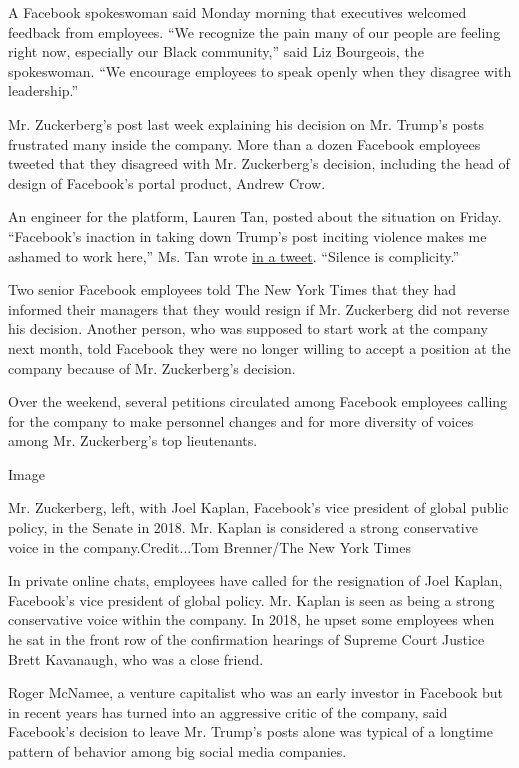A Facebook spokeswoman said Monday morning that executives welcomed
feedback from employees. ``We recognize the pain many of our people are
feeling right now, especially our Black community,'' said Liz Bourgeois,
the spokeswoman. ``We encourage employees to speak openly when they
disagree with leadership.''

Mr. Zuckerberg's post last week explaining his decision on Mr. Trump's
posts frustrated many inside the company. More than a dozen Facebook
employees tweeted that they disagreed with Mr. Zuckerberg's decision,
including the head of design of Facebook's portal product, Andrew Crow.

An engineer for the platform, Lauren Tan, posted about the situation on
Friday. ``Facebook's inaction in taking down Trump's post inciting
violence makes me ashamed to work here,'' Ms. Tan wrote
\href{https://twitter.com/sugarpirate_/status/1266470996162146304}{in a
tweet}. ``Silence is complicity.''

Two senior Facebook employees told The New York Times that they had
informed their managers that they would resign if Mr. Zuckerberg did not
reverse his decision. Another person, who was supposed to start work at
the company next month, told Facebook they were no longer willing to
accept a position at the company because of Mr. Zuckerberg's decision.

Over the weekend, several petitions circulated among Facebook employees
calling for the company to make personnel changes and for more diversity
of voices among Mr. Zuckerberg's top lieutenants.

Image

Mr. Zuckerberg, left, with Joel Kaplan, Facebook's vice president of
global public policy, in the Senate in 2018. Mr. Kaplan is considered a
strong conservative voice in the company.Credit...Tom Brenner/The New
York Times

In private online chats, employees have called for the resignation of
Joel Kaplan, Facebook's vice president of global policy. Mr. Kaplan is
seen as being a strong conservative voice within the company. In 2018,
he upset some employees when he sat in the front row of the confirmation
hearings of Supreme Court Justice Brett Kavanaugh, who was a close
friend.

Roger McNamee, a venture capitalist who was an early investor in
Facebook but in recent years has turned into an aggressive critic of the
company, said Facebook's decision to leave Mr. Trump's posts alone was
typical of a longtime pattern of behavior among big social media
companies.

